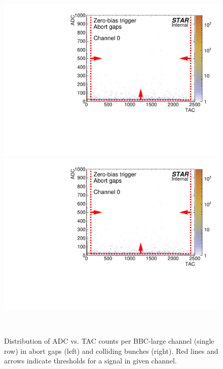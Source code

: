 \begin{figure}[hb]
\caption[Distribution of ADC vs. TAC counts per BBC-large channel in abort gaps and colliding bunches.]{Distribution of ADC vs. TAC counts per BBC-large channel (single row) in abort gaps (left) and colliding bunches (right). Red lines and arrows indicate thresholds for a signal in given channel.}\label{fig:bbsSmallAdcVsTac}
\centering
\parbox{0.495\textwidth}{
  \centering
  \includegraphics[width=\linewidth,page=17]{graphics/eventSelection/bbc/Bbc_ADCvsTAC_abortGaps.pdf}\\
  \includegraphics[width=\linewidth,page=18]{graphics/eventSelection/bbc/Bbc_ADCvsTAC_abortGaps.pdf}
}~
\parbox{0.495\textwidth}{
  \centering
}
\end{figure}

